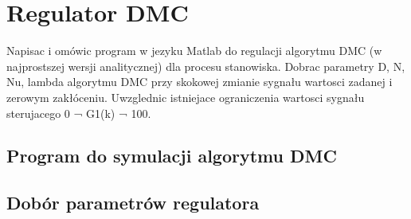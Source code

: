 \section{Regulator DMC}

Napisac i omówic program w jezyku Matlab do regulacji algorytmu DMC (w najprostszej
wersji analitycznej) dla procesu stanowiska. Dobrac parametry D, N, Nu, lambda
algorytmu DMC przy skokowej zmianie sygnału wartosci zadanej i zerowym zakłóceniu.
Uwzglednic istniejace ograniczenia wartosci sygnału sterujacego 0 ¬ G1(k) ¬ 100.

\subsection{Program do symulacji algorytmu DMC}

\subsection{Dobór parametrów regulatora}
